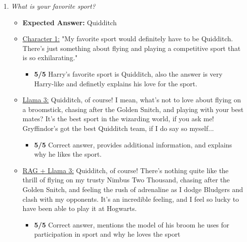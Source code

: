 \documentclass[fleqn,moreauthors,10pt]{ds_report}
\begin{document}
\begin{appendices}
\begin{enumerate}
            \item \textit{What is your favorite sport?}
            \begin{itemize}
                \item \textbf{Expected Answer:} Quidditch
                \item \underline{Character 1:} "My favorite sport would definitely have to be Quidditch. There's just something about flying and playing a competitive sport that is so exhilarating."
               \begin{itemize}
                    \item \textbf{5/5} Harry's favorite sport is Quidditch, also the answer is very Harry-like and definetly explains his love for the sport.
                \end{itemize}
                \item \underline{Llama 3:} Quidditch, of course! I mean, what's not to love about flying on a broomstick, chasing after the Golden Snitch, and playing with your best mates? It's the best sport in the wizarding world, if you ask me! Gryffindor's got the best Quidditch team, if I do say so myself...
                 \begin{itemize}
                    \item \textbf{5/5} Correct answer, provides additional information, and explains why he likes the sport. 
                \end{itemize}
                \item \underline{RAG + Llama 3:} Quidditch, of course! There's nothing quite like the thrill of flying on my trusty Nimbus Two Thousand, chasing after the Golden Snitch, and feeling the rush of adrenaline as I dodge Bludgers and clash with my opponents. It's an incredible feeling, and I feel so lucky to have been able to play it at Hogwarts.
                \begin{itemize}
                    \item \textbf{5/5} Correct answer, mentions the model of his broom he uses for participation in sport and why he loves the sport
                \end{itemize}
            \end{itemize}
        

\end{enumerate}
\end{appendices}
\end{document}
